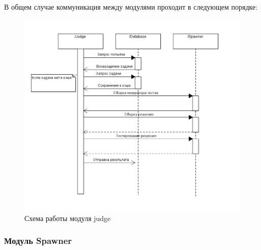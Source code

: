 \documentclass{imcs}
\begin{document}
В общем случае коммуникация между модулями проходит в следующем порядке:

\begin{figure}[htb]
\centering
\includegraphics{./img/judgeinteraction.png}
\caption{Схема работы модуля judge}
\label{judgeinteraction}
\end{figure}

\subsubsection{Модуль Spawner}
\end{document}
